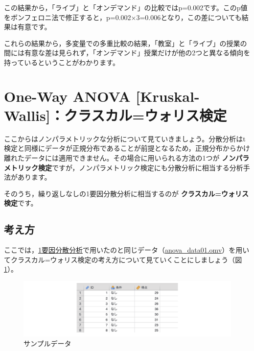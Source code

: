 \documentclass[
  12pt,
  a5jpaper,
  lualatex, ja=standard]{bxjsbook}
\renewcommand{\emph}[1]{\textbf{\color{emph} #1}}
\begin{document}
この結果から，「ライブ」と「オンデマンド」の比較ではp=0.002です。このp値をボンフェロニ法で修正すると，p=0.002×3=0.006となり，この差についても結果は有意です。

これらの結果から，多変量での多重比較の結果，「教室」と「ライブ」の授業の間には有意な差は見られず，「オンデマンド」授業だけが他の2つと異なる傾向を持っているということがわかります。

\hypertarget{sec:ANOVA-kw}{%
\section{One-Way ANOVA {[}Kruskal-Wallis{]}：クラスカル=ウォリス検定}\label{sec:ANOVA-kw}}

ここからはノンパラメトリックな分析について見ていきましょう。分散分析はt検定と同様にデータが正規分布であることが前提となるため，正規分布からかけ離れたデータには適用できません。その場合に用いられる方法の1つが\emph{ノンパラメトリック検定}ですが，ノンパラメトリック検定にも分散分析に相当する分析手法があります。

そのうち，繰り返しなしの1要因分散分析に相当するのが\emph{クラスカル=ウォリス検定}です。

\hypertarget{sub:ANOVA-kw-basics}{%
\subsection{考え方}\label{sub:ANOVA-kw-basics}}

ここでは，\protect\hyperlink{sec:ANOVA-oneway}{1要因分散分析}で用いたのと同じデータ（\href{https://github.com/sbtseiji/jmv_compguide/raw/main/data/omv/anova_data01.omv}{anova\_data01.omv}）を用いてクラスカル=ウォリス検定の考え方について見ていくことにしましょう（図\ref{fig:ANOVA-data01-kw}）。

\begin{figure}[!ht]

{\centering \includegraphics[width=1\linewidth]{images/ANOVA/data01} 

}

\caption{サンプルデータ}\label{fig:ANOVA-data01-kw}
\end{figure}
\end{document}
